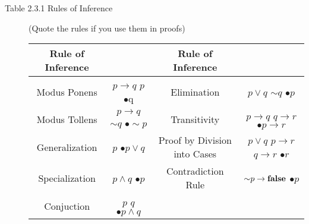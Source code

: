 \documentclass{article}
\begin{document}
\begin{description}
\begin{table}[h]
{\begin{tabular}{|c|c|c|c|}
            \hline
        \end{tabular}}
        \label{tab:1}
    \end{table}
    \item[Table 2.3.1 Rules of Inference] (Quote the rules if you use them in proofs)
    \begin{table}[h]
    	\centering
		{
		\begin{tabular}{|c|c|c|c|} 
			\hline
			Rule of Inference & & Rule of Inference & \\
			\hline
			Modus Ponens & $p\to q$ \quad $p$ \quad $\bullet$q & Elimination & $p\lor q$ \quad ${\sim} q$ \quad $\bullet p$ \\
			Modus Tollens & $p\to q$ \quad ${\sim} q$ \quad $\bullet{\sim} p$ & Transitivity & $p\to q$ \quad $q\to r$ \quad $\bullet p\to r$ \\
			Generalization &  $p$ \quad $\bullet p\lor q$ & Proof by Division into Cases  & $p\lor q$ \quad $p\to r$ \quad $q\to r$ \quad $\bullet r$ \\
			Specialization &  $p\land q$ \quad $\bullet p$ & Contradiction Rule & ${\sim}{p}\to\text{\textbf{false}}$ \quad $\bullet p$ \\
			Conjuction & $p$ \quad $q$ \quad $\bullet p\land q$ & \ & \\
			\hline
		\end{tabular}}
		\label{tab:2}
    \end{table}
    

\end{description}
\end{document}
